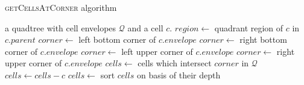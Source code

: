 \begin{algorithm}
    \ssp
    \small
    \caption{\textsc{getCellsAtCorner} algorithm}\label{alg:two}
    \begin{algorithmic}[1]
    \Require a quadtree with cell envelopes $\mathcal Q$ and a cell $c$.
        \State $region \gets $ quadrant region of $c$ in $c.parent$
                \State $corner \gets$ left bottom corner of $c.envelope$
            \EndCase
                \State $corner \gets$ right bottom corner of $c.envelope$
            \EndCase
                \State $corner \gets$ left upper corner of $c.envelope$
            \EndCase
                \State $corner \gets$ right upper corner of $c.envelope$
            \EndCase
        \EndSwitch
        \State $cells \gets$ cells which intersect $corner$ in $\mathcal Q$
        \State $cells \gets cells - c$
        \State $cells \gets$ sort $cells$ on basis of their depth
        \State {}
    \EndFunction
    \end{algorithmic}
\end{algorithm}

